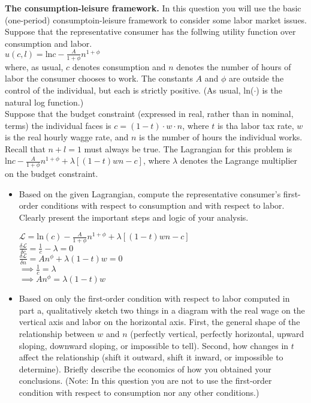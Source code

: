 \documentclass[11pt]{SelfArxOneColBMN}
\begin{document}
\begin{exercise}
	\textbf{The consumption-leisure framework.} In this question you will use the basic (one-period) consumptoin-leisure framework to consider some labor market issues. Suppose that the representative consumer has the follwing utility function over consumption and labor.\\
	\indent $u(c,l) = \text{ln}c - \frac{A}{1 + \phi}n^{1+\phi}$\\
	where, as usual, $c$ denotes consumption and $n$ denotes the number of hours of labor the consumer chooses to work. The constants $A$ and $\phi$ are outside the control of the individual, but each is strictly positive. (As usual, ln($\cdot$) is the natural log function.)\\
	Suppose that the budget constraint (expressed in real, rather than in nominal, terms) the individual faces is $c = (1 - t)\cdot w \cdot n$, where $t$ is tha labor tax rate, $w$ is the real hourly wagge rate, and $n$ is the number of hours the individual works.\\
	Recall that $n + l = 1$ must always be true. The Lagrangian for this problem is\\
	\indent $\text{ln}c-\frac{A}{1 + \phi}n^{1 + \phi} + \lambda[(1 - t)wn - c]$, where $\lambda$ denotes the Lagrange multiplier on the budget constraint.
	\begin{itemize} 
		\item Based on the given Lagrangian, compute the representative consumer's first-order conditions with respect to consumption and with respect to labor. Clearly present the important steps and logic of your analysis.
		\begin{solution}
			\begin{center}
				$\mathcal{L} = \text{ln}(c) - \frac{A}{1 + \phi}n^{1 + \phi} + \lambda[(1 - t)wn - c]$\\
				$\frac{\delta \mathcal{L}}{\delta c} = \frac{1}{c} - \lambda = 0$\\
				$\frac{\delta \mathcal{L}}{\delta n} = An^\phi + \lambda(1 - t)w = 0 $\\
				$\implies \frac{1}{c} = \lambda$\\
				$\implies An^\phi = \lambda(1 - t)w$\\
			\end{center}
		\end{solution}
		\item Based on only the first-order condition with respect to labor computed in part a, qualitatively sketch two things in a diagram with the real wage on the vertical axis and labor on the horizontal axis. First, the general shape of the relationship between $w$ and $n$ (perfectly vertical, perfectly horizontal, upward sloping, downward sloping, or impossible to tell). Second, how changes in $t$ affect the relationship (shift it outward, shift it inward, or impossible to determine). Briefly describe the economics of how you obtained your conclusions. (Note: In this question you are not to use the first-order condition with respect to consumption nor any other conditions.)

\end{itemize}
\end{exercise}
\end{document}

